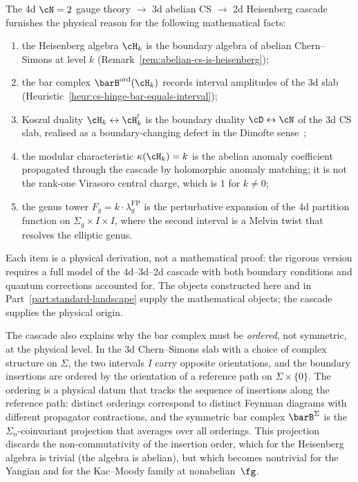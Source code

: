 \begin{heuristic}
\label{heur:cs-hinge-cascade}
The 4d $\cN = 2$ gauge theory $\to$ 3d abelian CS $\to$ 2d
Heisenberg cascade furnishes the physical reason for the
following mathematical facts:
\begin{enumerate}[label=\textup{(\roman*)}]
\item the Heisenberg algebra $\cH_k$ is the boundary algebra of
abelian Chern--Simons at level $k$
(Remark~\ref{rem:abelian-cs-is-heisenberg});
\item the bar complex $\barB^{\mathrm{ord}}(\cH_k)$ records
interval amplitudes of the 3d slab
(Heuristic~\ref{heur:cs-hinge-bar-equals-interval});
\item Koszul duality $\cH_k \leftrightarrow \cH_k^!$ is the
boundary duality $\cD \leftrightarrow \cN$ of the 3d CS slab,
realised as a boundary-changing defect in the Dimofte
sense~\cite{CostelloGaiotto2020};
\item the modular characteristic $\kappa(\cH_k) = k$ is the
abelian anomaly coefficient propagated through the cascade by
holomorphic anomaly matching; it is not the rank-one Virasoro
central charge, which is $1$ for $k\neq0$;
\item the genus tower $F_g = k \cdot \lambda_g^{\mathrm{FP}}$
is the perturbative expansion of the 4d partition function on
$\Sigma_g \times I \times I$, where the second interval is a
Melvin twist that resolves the elliptic genus.
\end{enumerate}
Each item is a physical derivation, not a mathematical proof: the
rigorous version requires a full model of the 4d--3d--2d cascade
with both boundary conditions and quantum corrections accounted
for. The objects constructed here and in
Part~\ref{part:standard-landscape}
supply the mathematical objects; the cascade supplies the
physical origin.
\end{heuristic}

The cascade also explains why the bar complex must be
\emph{ordered}, not symmetric, at the physical level. In the 3d
Chern--Simons slab with a choice of complex structure on
$\Sigma$, the two intervals $I$ carry opposite orientations, and
the boundary insertions are ordered by the orientation of a
reference path on $\Sigma \times \{0\}$. The ordering is a
physical datum that tracks the sequence of insertions along the
reference path: distinct orderings correspond to distinct
Feynman diagrams with different propagator contractions, and the
symmetric bar complex $\barB^{\Sigma}$ is the $\Sigma_n$-coinvariant
projection that averages over all orderings. This projection
discards the non-commutativity of the insertion order, which for
the Heisenberg algebra is trivial (the algebra is abelian), but
which becomes nontrivial for the Yangian and for the Kac--Moody
family at nonabelian~$\fg$.


